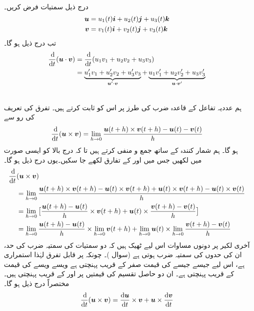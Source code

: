 \\
درج ذیل سمتیات فرض کریں۔
\begin{align*}
{\ensuremath{{\boldsymbol{u}}}}&=u_1(t){\boldsymbol{i}}+u_2(t){\boldsymbol{j}}+u_3(t){\boldsymbol{k}}\\
{{\boldsymbol{v}}}&=v_1(t){\boldsymbol{i}}+v_2(t){\boldsymbol{j}}+v_3(t){\boldsymbol{k}}
\end{align*} 
تب درج  ذیل ہو گا۔
\begin{align*}
\frac{\dif}{\dif t}(\kvec{u}\cdot \kvec{v})&=\frac{\dif}{\dif t}(u_1v_1+u_2v_2+u_3v_3)\\
&=\underbrace{u_1'v_1+u_2'v_2+u_3'v_3}_{\kvec{u}'\cdot \kvec{v}}+\underbrace{u_1v_1'+u_2v_2'+u_3v_3'}_{\kvec{u}\cdot\kvec{v}'}
\end{align*}

\\
ہم عددیہ تفاعل کے قاعدہ ضرب کی طرز پر  اس کو ثابت کرتے ہیں۔ تفرق کی تعریف کی رو سے
\begin{align*}
\frac{\dif}{\dif t}(\kvec{u}\times \kvec{v})=\lim_{h\to 0}\frac{\kvec{u}(t+h)\times \kvec{v}(t+h)-\kvec{u}(t)-\kvec{v}(t)}{h}
\end{align*}
ہو گا۔ ہم  شمار کنندہ  کے ساتھ    جمع و منفی کرتے ہیں تا کہ درج بالا   کو ایسی صورت میں لکھیں جس میں   اور  کے تفارق  لکھے جا سکیں۔یوں درج ذیل ہو گا۔
\begin{align*}
\frac{\dif}{\dif t}&(\kvec{u}\times \kvec{v})\\
&=\lim_{h\to 0}\frac{\kvec{u}(t+h)\times \kvec{v}(t+h)-\kvec{u}(t)\times \kvec{v}(t+h)+\kvec{u}(t)\times \kvec{v}(t+h)-\kvec{u}(t)\times \kvec{v}(t)}{h}\\
&=\lim_{h\to 0}\big[\frac{\kvec{u}(t+h)-\kvec{u}(t)}{h}\times \kvec{v}(t+h)+\kvec{u}(t)\times \frac{\kvec{v}(t+h)-\kvec{v}(t)}{h}\big]\\
&=\lim_{h\to 0}\frac{\kvec{u}(t+h)-\kvec{u}(t)}{h}\times \lim_{h\to 0}\kvec{v}(t+h)+\lim_{h\to 0}\kvec{u}(t)\times \lim_{h\to 0}\frac{\kvec{v}(t+h)-\kvec{v}(t)}{h}
\end{align*}
آخری لکیر پر دونوں مساوات اس لیے ٹھیک ہیں کہ دو سمتیات کی سمتیہ ضرب کی حد،  ان کی حدوں کی سمتیہ    ضرب ہوتی ہے (سوال )۔  چونکہ  پر  قابل تفرق لہٰذا استمراری ہے، اس لیے   جیسے جیسے  کی قیمت صفر کے قریب  پہنچتی ہے ویسے ویسے   کی قیمت  کے قریب  پہنچتی ہے۔ ان  دو حاصل تقسیم کی قیمتیں   پر   اور  کے قریب  پہنچتی ہیں۔مختصراً درج ذیل ہو گا۔
\begin{align*}
\frac{\dif}{\dif t}(\kvec{u}\times\kvec{v})=\frac{\dif \kvec{u}}{\dif t}\times \kvec{v}+\kvec{u}\times\frac{\dif \kvec{v}}{\dif t}
\end{align*} 

